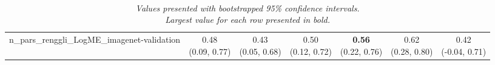 \begin{table}[H]
\begin{tabular}{c|cccccc}
\hline
n_pars_renggli_LogME_imagenet-validation & \makecell{0.48 \\[0pt] (0.09, 0.77)} & \makecell{0.43 \\[0pt] (0.05, 0.68)} & \makecell{0.50 \\[0pt] (0.12, 0.72)} & \makecell{\textbf{0.56} \\[0pt] (0.22, 0.76)} & \makecell{0.62 \\[0pt] (0.28, 0.80)} & \makecell{0.42 \\[0pt] (-0.04, 0.71)} \\
\end{tabular}
\caption*{\\\textit{Values presented with bootstrapped 95\% confidence intervals.\\
Largest value for each row presented in bold.}}
\end{table}

